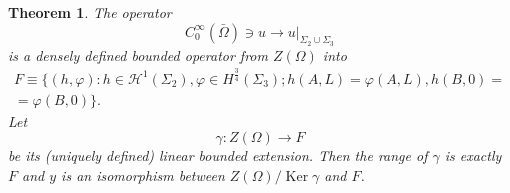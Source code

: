 \documentclass[a4paper,12pt,leqno]{article}
\newtheorem{theorem}[proposition]{Theorem}
\numberwithin{equation}{section}
\DeclareMathOperator{\Ker}{Ker}
\begin{document}
\begin{theorem} \label{TH:2.1}
	The operator
	\begin{equation} \label{2.8}
		C_{0}^{\infty}(\bar{\Omega}) \ni u \rightarrow u|_{\Sigma_2 \cup \Sigma_{3}}
	\end{equation}
	is a densely defined bounded operator from $Z(\Omega)$ into
	\begin{equation*}
		\begin{gathered}
			F \equiv \Big\{ (h, \varphi): h \in \mathscr{H}^1\left(\Sigma_{2}\right), 
			\varphi \in H^{\frac 3 4 }\left(\Sigma_{3}\right); 
			h(A, L)=\varphi(A, L), h(B, 0)= \\
			=\varphi(B, 0) \Big\}.
		\end{gathered}
	\end{equation*}
	Let
	\begin{equation*}
		\gamma: Z(\Omega) \rightarrow F
	\end{equation*}
	be its (uniquely defined) linear bounded extension. Then the range of $\gamma$ is exactly $F$ and $y$ is an isomorphism between $Z(\Omega)/\Ker \gamma$ and $F$.
\end{theorem}
\end{document}
